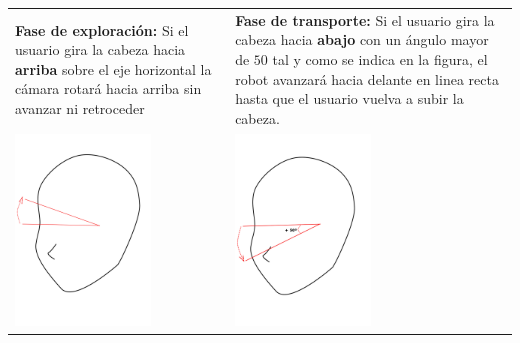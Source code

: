 \documentclass[twoside, 11pt]{epstfg}
\begin{document}
\begin{table}[H]
	\begin{tabular}{p{7.0cm}  p{7.0cm}}
		\textbf{Fase de exploración:} Si el usuario gira la cabeza hacia \textbf{arriba} sobre el eje horizontal la cámara rotará hacia arriba sin avanzar ni retroceder & \textbf{Fase de transporte:} Si el usuario gira la cabeza hacia \textbf{abajo} con un ángulo mayor de $50$ tal y como se indica en la figura, el robot avanzará hacia delante en linea recta hasta que el usuario vuelva a subir la cabeza. \\
		\centering\includegraphics[height=2in]{images/movupbuena.png} & \centering\includegraphics[height=2in]{images/movdownbuena.png}\\
	\end{tabular}
\end{table}
\end{document}
